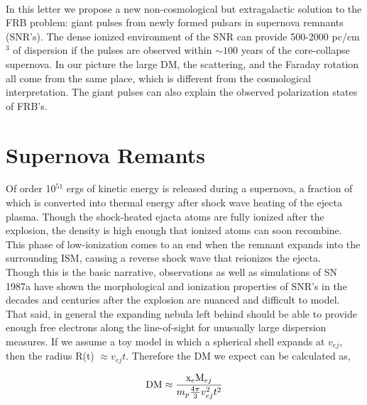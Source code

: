 \documentclass[useAMS,usenatbib]{emulateapj}
\begin{document}
\\
In this letter we propose a new non-cosmological but extragalactic
solution to the FRB problem: giant pulses from newly formed pulsars in 
supernova remnants (SNR's). The dense ionized environment of the SNR
can provide 500-2000 pc/cm$^3$ of dispersion if the pulses are observed 
within $\sim100$ years of the core-collapse supernova. In our picture the 
large DM, the scattering, and the Faraday rotation all come from the same place, 
which is different from the cosmological interpretation.
The giant pulses can also explain the observed polarization states of FRB's. 


\section{Supernova Remants}
Of order 10$^{51}$ ergs of kinetic energy is released during a supernova, a 
fraction of which is converted into thermal 
energy after shock wave heating of the 
ejecta plasma. Though the shock-heated ejacta atoms 
are fully ionized after the explosion, the density is high enough that
ionized atoms can soon recombine.
This phase of low-ionization comes to an end when the remnant expands 
into the surrounding ISM, causing a reverse shock wave that reionizes the ejecta.
\\
Though this is the basic narrative, observations \citep{2014ApJ...796...82Z} 
as well as simulations \citep{2014ApJ...794..174P}
of SN 1987a have shown the morphological and ionization properties of SNR's
in the decades and centuries after the explosion are nuanced and 
difficult to model.
That said, in general the expanding nebula left behind 
should be able to provide enough free electrons
along the line-of-sight for unusually large dispersion measures. If we 
assume a toy model in which a spherical shell expands at $v_{ej}$, 
then the radius R(t) $\approx v_{ej} t$. Therefore the DM we expect can be 
calculated as,

\begin{equation}
\textup{DM} \approx  \frac{\textup{x}_e \textup{M}_{ej}}{m_p \frac{4\pi}{3} v_{ej}^2 t^2}
\end{equation}
\end{document}
